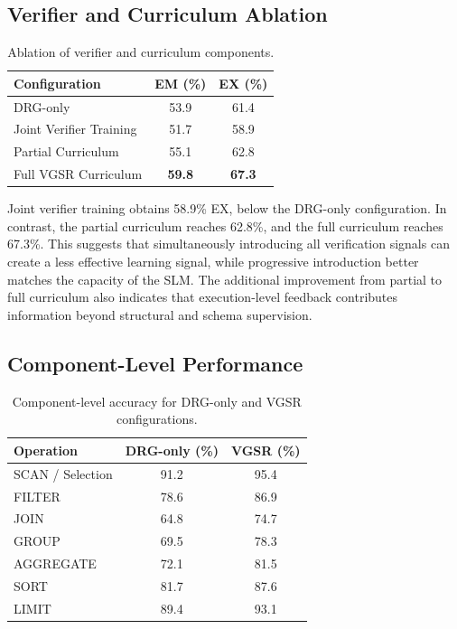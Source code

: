 \documentclass[conference]{IEEEtran}
\begin{document}
\subsection{Verifier and Curriculum Ablation}
\begin{table}[t]
\centering
\caption{Ablation of verifier and curriculum components.}
\label{tab:verifier_ablation}
\begin{tabular}{lcc}
\toprule
Configuration & EM (\%) & EX (\%)\\
\midrule
DRG-only & 53.9 & 61.4\\
Joint Verifier Training & 51.7 & 58.9\\
Partial Curriculum & 55.1 & 62.8\\
Full VGSR Curriculum & \textbf{59.8} & \textbf{67.3}\\
\bottomrule
\end{tabular}
\end{table}

Joint verifier training obtains 58.9\% EX, below the DRG-only configuration. In contrast, the partial curriculum reaches 62.8\%, and the full curriculum reaches 67.3\%. This suggests that simultaneously introducing all verification signals can create a less effective learning signal, while progressive introduction better matches the capacity of the SLM. The additional improvement from partial to full curriculum also indicates that execution-level feedback contributes information beyond structural and schema supervision.

\subsection{Component-Level Performance}
\begin{table}[t]
\centering
\caption{Component-level accuracy for DRG-only and VGSR configurations.}
\label{tab:component_results}
\begin{tabular}{lcc}
\toprule
Operation & DRG-only (\%) & VGSR (\%)\\
\midrule
SCAN / Selection & 91.2 & 95.4\\
FILTER & 78.6 & 86.9\\
JOIN & 64.8 & 74.7\\
GROUP & 69.5 & 78.3\\
AGGREGATE & 72.1 & 81.5\\
SORT & 81.7 & 87.6\\
LIMIT & 89.4 & 93.1\\
\bottomrule
\end{tabular}
\end{table}
\end{document}

